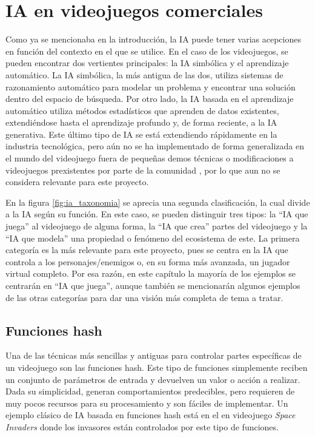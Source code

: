 \section{IA en videojuegos comerciales} \label{sec:ia_videojuegos}

Como ya se mencionaba en la introducción, la IA puede tener varias acepciones en función del contexto en el que se utilice. En el caso de los videojuegos, se pueden encontrar dos vertientes principales: la IA simbólica y el aprendizaje automático. La IA simbólica, la más antigua de las dos, utiliza sistemas de razonamiento automático para modelar un problema y encontrar una solución dentro del espacio de búsqueda. Por otro lado, la IA basada en el aprendizaje automático utiliza métodos estadísticos que aprenden de datos existentes, extendiéndose hasta el aprendizaje profundo y, de forma reciente, a la IA generativa. Este último tipo de IA se está extendiendo rápidamente en la industria tecnológica, pero aún no se ha implementado de forma generalizada en el mundo del videojuego fuera de pequeñas demos técnicas o modificaciones a videojuegos prexistentes por parte de la comunidad \cite{thompson_how_2025}, por lo que aun no se considera relevante para este proyecto.

En la figura \ref{fig:ia_taxonomia} se aprecia una segunda clasificación, la cual divide a la IA según su función. En este caso, se pueden distinguir tres tipos: la ``IA que juega'' al videojuego de alguna forma, la ``IA que crea'' partes del videojuego y la ``IA que modela'' una propiedad o fenómeno del ecosistema de este. La primera categoría es la más relevante para este proyecto, pues se centra en la IA que controla a los personajes/enemigos o, en su forma más avanzada, un jugador virtual completo. Por esa razón, en este capítulo la mayoría de los ejemplos se centrarán en ``IA que juega'', aunque también se mencionarán algunos ejemplos de las otras categorías para dar una visión más completa de tema a tratar.

\subsection{Funciones hash}

Una de las técnicas más sencillas y antiguas para controlar partes específicas de un videojuego son las funciones hash. Este tipo de funciones simplemente reciben un conjunto de parámetros de entrada y devuelven un valor o acción a realizar. Dada su simplicidad, generan comportamientos predecibles, pero requieren de muy pocos recursos para su procesamiento y son fáciles de implementar. Un ejemplo clásico de IA basada en funciones hash está en el en videojuego \textit{Space Invaders} \cite{wikipedia_artificial_2025} donde los invasores están controlados por este tipo de funciones.

